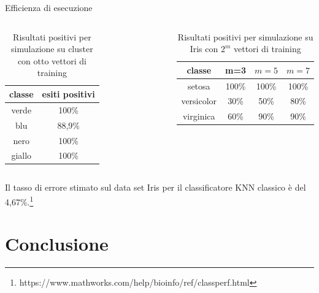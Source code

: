 \documentclass{beamer}
\begin{document}
    \begin{frame}{Efficienza di esecuzione}
        \begin{columns}
            \begin{table}[h!]
                \centering
                \begin{tabular}{c c}
                    classe & esiti positivi\\
                    \hline
                    verde & 100\%\\
                    blu & 88,9\%\\
                    nero & 100\%\\
                    giallo & 100\%
                \end{tabular}
                \caption{Risultati positivi per simulazione su cluster con otto vettori di training}
            \end{table}    
            \begin{table}[h!]
                \centering
                \begin{tabular}{c c c c}
                    classe & m=3 & $m=5$ & $m=7$ \\ 
                    \hline
                    setosa & 100\% & 100\% & 100\%\\ 
                    versicolor & 30\% & 50\% & 80\%\\ 
                    virginica & 60\% & 90\% & 90\%
                \end{tabular}
                \caption{Risultati positivi per simulazione su Iris con $2^m$ vettori di training}
                \label{table:misure}
            \end{table}
        \end{columns}
        Il tasso di errore stimato sul data set Iris per il classificatore KNN classico è del 4,67\%.\footnote{https://www.mathworks.com/help/bioinfo/ref/classperf.html}
    \end{frame}

    \section{Conclusione}
\end{document}

